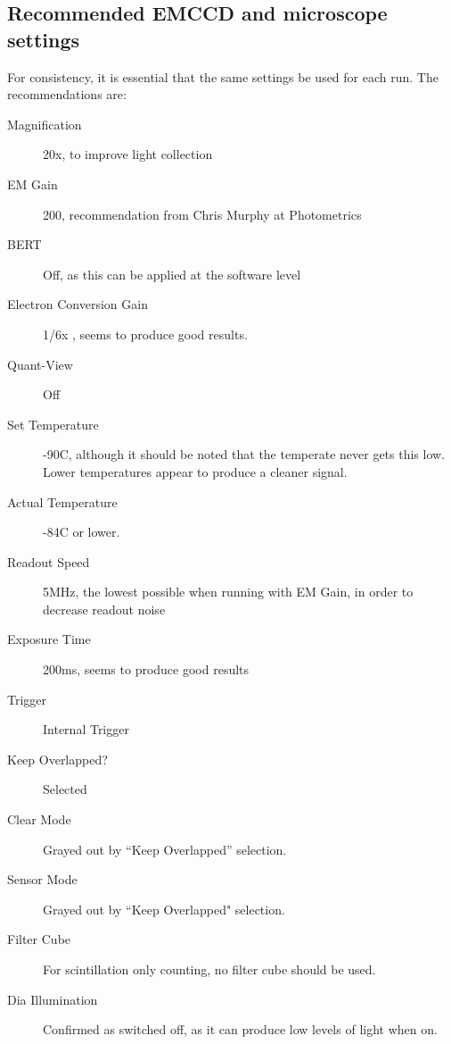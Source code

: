 \documentclass[11pt]{article}
\begin{document}
\subsection{Recommended EMCCD and microscope settings}
For consistency, it is essential that the same settings be used for each run. The recommendations are:
\begin{description}
\item[Magnification] 20x, to improve light collection 
\item[EM Gain] 200, recommendation from Chris Murphy at Photometrics 
\item[BERT] Off, as this can be applied at the software level
\item[Electron Conversion Gain] 1/6x , seems to produce good results.
\item[Quant-View] Off
\item[Set Temperature] -90C, although it should be noted that the temperate never gets this low. Lower temperatures appear to produce a cleaner signal. 
\item[Actual Temperature] -84C or lower. 
\item[Readout Speed] 5MHz, the lowest possible when running with EM Gain, in order to decrease readout noise
\item[Exposure Time] 200ms, seems to produce good results
\item[Trigger] Internal Trigger 
\item[Keep Overlapped?] Selected
\item[Clear Mode] Grayed out by ``Keep Overlapped'' selection.
\item[Sensor Mode] Grayed out by ``Keep Overlapped" selection.
\item[Filter Cube] For scintillation only counting, no filter cube should be used. 
\item[Dia Illumination] Confirmed as switched off, as it can produce low levels of light when on.
\end{description} 
\end{document}
